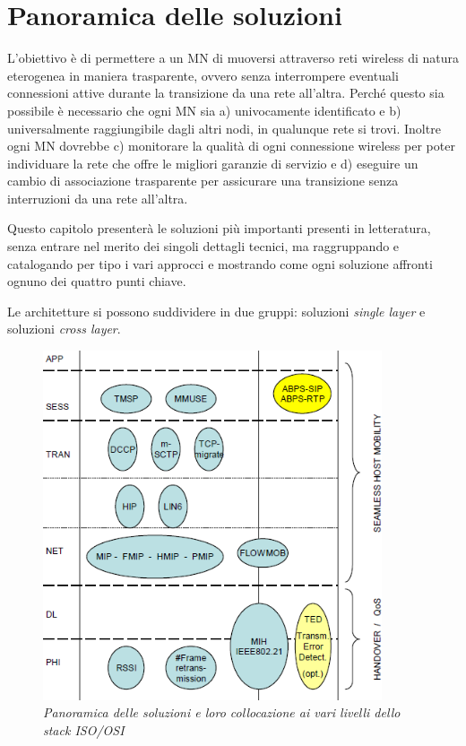 \documentclass[12pt,a4paper,openright,twoside]{book}
\begin{document}
\clearpage{\pagestyle{empty}\cleardoublepage}

\chapter{Panoramica delle soluzioni}
\lhead[\fancyplain{}{\bfseries\thepage}]{\fancyplain{}{\bfseries\rightmark}}
L'obiettivo è di permettere a un MN di muoversi attraverso reti
wireless di natura eterogenea in maniera trasparente, ovvero senza
interrompere eventuali connessioni attive durante la transizione da
una rete all'altra. Perché questo sia possibile è necessario che ogni
MN sia a) univocamente identificato e b) universalmente raggiungibile
dagli altri nodi, in qualunque rete si trovi. Inoltre ogni MN dovrebbe
c) monitorare la qualità di ogni connessione wireless per poter
individuare la rete che offre le migliori garanzie di servizio e d)
eseguire un cambio di associazione trasparente per assicurare una
transizione senza interruzioni da una rete all'altra.

Questo capitolo presenterà le soluzioni più importanti presenti in
letteratura, senza entrare nel merito dei singoli dettagli tecnici, ma
raggruppando e catalogando per tipo i vari approcci e mostrando come
ogni soluzione affronti ognuno dei quattro punti chiave.

Le architetture si possono suddividere in due gruppi: soluzioni
\emph{single layer} e soluzioni \emph{cross layer}.

\begin{figure}
  \centering
  \includegraphics[width=10cm]{img/panoramica-soluzioni}
  \caption{\em Panoramica delle soluzioni e loro collocazione ai vari
    livelli dello stack ISO/OSI}
  \label{fig:panoramica}
\end{figure}
\end{document}
